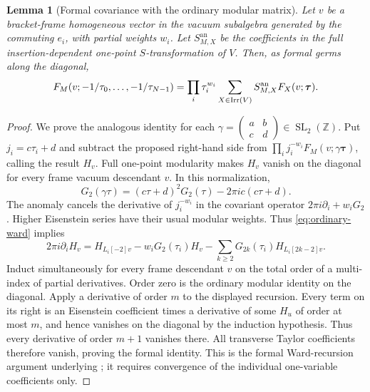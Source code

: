 \documentclass[11pt,a4paper]{article}
\numberwithin{equation}{section}
\newtheorem{lemma}[theorem]{Lemma}
\theoremstyle{definition}\newtheorem{definition}[theorem]{Definition}
\theoremstyle{remark}\newtheorem{remark}[theorem]{Remark}
\begin{document}
\begin{lemma}[Formal covariance with the ordinary modular matrix]
\label{lem:ordinary-jets}
Let $v$ be a bracket-frame homogeneous vector in the vacuum
subalgebra generated by the commuting $e_i$, with partial weights
$w_i$. Let $S_{M,X}^{\mathrm{an}}$ be the coefficients in the full
insertion-dependent one-point $S$-transformation of $V$.
Then, as formal germs along the diagonal,
\[
 F_M(v;-1/\tau_0,\ldots,-1/\tau_{N-1})
    =\prod_i\tau_i^{w_i}
       \sum_{X\in\operatorname{Irr}(V)} S_{M,X}^{\mathrm{an}}
                              F_X(v;\boldsymbol\tau).
\]
\end{lemma}
\begin{proof}
We prove the analogous identity for each
$\gamma=\left(\begin{smallmatrix}a&b\\c&d\end{smallmatrix}\right)
\in\operatorname{SL}_2(\mathbb Z)$.
Put $j_i=c\tau_i+d$ and subtract the proposed right-hand side from
$\prod_i j_i^{-w_i}F_M(v;\gamma\boldsymbol\tau)$, calling the result
$H_v$.  Full one-point modularity makes $H_v$ vanish on the diagonal
for every frame vacuum descendant $v$.  In this normalization,
\[
 G_2(\gamma\tau)=(c\tau+d)^2G_2(\tau)-2\pi ic(c\tau+d).
\]
The anomaly cancels the derivative of $j_i^{-w_i}$ in the covariant
operator $2\pi i\partial_i+w_iG_2$.  Higher Eisenstein series have
their usual modular weights.  Thus \eqref{eq:ordinary-ward} implies
\[
 2\pi i\partial_iH_v
 =H_{L_i[-2]v}-w_iG_2(\tau_i)H_v
       -\sum_{k\ge2}G_{2k}(\tau_i)H_{L_i[2k-2]v}.
\]
Induct simultaneously for every frame descendant $v$ on the total
order of a multi-index of partial derivatives.  Order zero is the
ordinary modular identity on the diagonal.  Apply a derivative of
order $m$ to the displayed recursion.  Every term on its right is an
Eisenstein coefficient times a derivative of some $H_u$ of order at
most $m$, and hence vanishes on the diagonal by the induction
hypothesis.  Thus every derivative of order $m+1$ vanishes there.
All transverse Taylor coefficients therefore vanish, proving the
formal identity.  This is the formal Ward-recursion argument
underlying \cite{km}; it requires convergence of the individual
one-variable coefficients only.
\end{proof}
\end{document}
